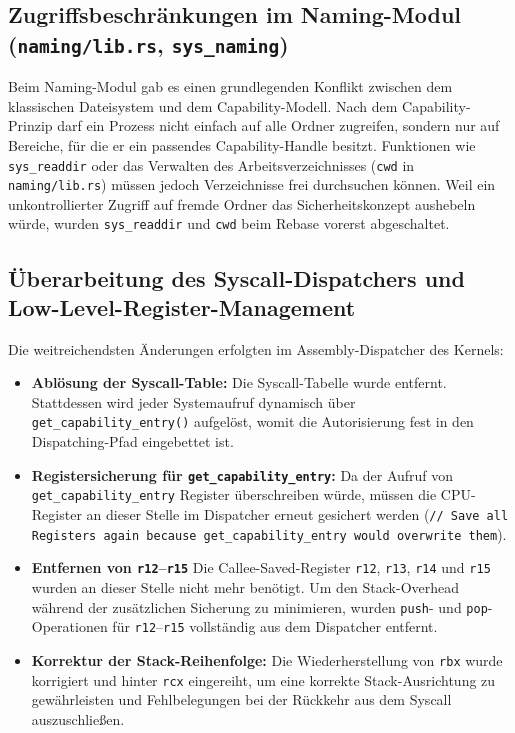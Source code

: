 \subsection{Zugriffsbeschränkungen im Naming-Modul (\texttt{naming/lib.rs}, \texttt{sys\_naming})}

Beim Naming-Modul gab es einen grundlegenden Konflikt zwischen dem klassischen Dateisystem und dem Capability-Modell. Nach dem Capability-Prinzip darf ein Prozess nicht einfach auf alle Ordner zugreifen, sondern nur auf Bereiche, für die er ein passendes Capability-Handle besitzt. Funktionen wie \texttt{sys\_readdir} oder das Verwalten des Arbeitsverzeichnisses (\texttt{cwd} in \texttt{naming/lib.rs}) müssen jedoch Verzeichnisse frei durchsuchen können. Weil ein unkontrollierter Zugriff auf fremde Ordner das Sicherheitskonzept aushebeln würde, wurden \texttt{sys\_readdir} und \texttt{cwd} beim Rebase vorerst abgeschaltet.

\subsection{Überarbeitung des Syscall-Dispatchers und Low-Level-Register-Management}

Die weitreichendsten Änderungen erfolgten im Assembly-Dispatcher des Kernels:

\begin{itemize}
    \item \textbf{Ablösung der Syscall-Table:} Die Syscall-Tabelle wurde entfernt. Stattdessen wird jeder Systemaufruf dynamisch über \texttt{get\_capability\_entry()} aufgelöst, womit die Autorisierung fest in den Dispatching-Pfad eingebettet ist.
    \item \textbf{Registersicherung für \texttt{get\_capability\_entry}:} Da der Aufruf von \texttt{get\_capability\_entry} Register überschreiben würde, müssen die CPU-Register an dieser Stelle im Dispatcher erneut gesichert werden (\texttt{// Save all Registers again because get\_capability\_entry would overwrite them}).
    \item \textbf{Entfernen von \texttt{r12}--\texttt{r15}} Die Callee-Saved-Register \texttt{r12}, \texttt{r13}, \texttt{r14} und \texttt{r15} wurden an dieser Stelle nicht mehr benötigt. Um den Stack-Overhead während der zusätzlichen Sicherung zu minimieren, wurden \texttt{push}- und \texttt{pop}-Operationen für \texttt{r12}--\texttt{r15} vollständig aus dem Dispatcher entfernt.
    \item \textbf{Korrektur der Stack-Reihenfolge:} Die Wiederherstellung von \texttt{rbx} wurde korrigiert und hinter \texttt{rcx} eingereiht, um eine korrekte Stack-Ausrichtung zu gewährleisten und Fehlbelegungen bei der Rückkehr aus dem Syscall auszuschließen.
\end{itemize}


